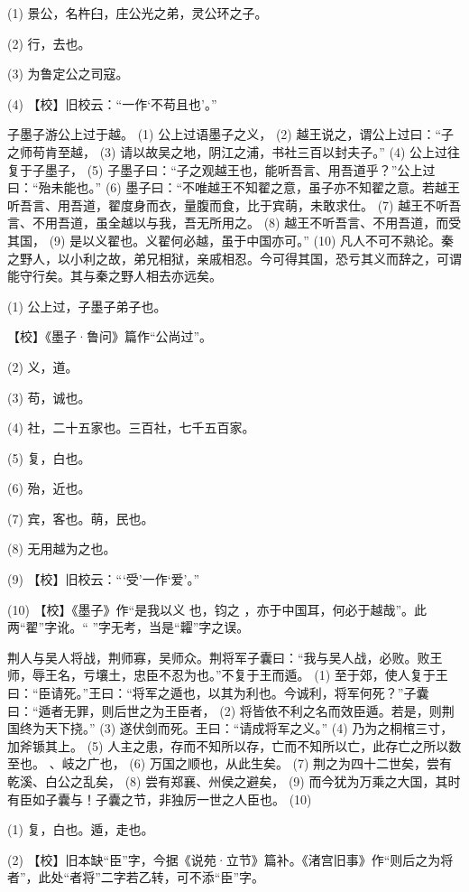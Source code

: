 \documentclass[12pt,UTF8]{ctexbook}
\begin{document}
(1) 景公，名杵臼，庄公光之弟，灵公环之子。

(2) 行，去也。

(3) 为鲁定公之司寇。

(4) 【校】旧校云：“一作‘不苟且也’。”

子墨子游公上过于越。 (1) 公上过语墨子之义， (2) 越王说之，谓公上过曰：“子之师苟肯至越， (3) 请以故吴之地，阴江之浦，书社三百以封夫子。” (4) 公上过往复于子墨子， (5) 子墨子曰：“子之观越王也，能听吾言、用吾道乎？”公上过曰：“殆未能也。” (6) 墨子曰：“不唯越王不知翟之意，虽子亦不知翟之意。若越王听吾言、用吾道，翟度身而衣，量腹而食，比于宾萌，未敢求仕。 (7) 越王不听吾言、不用吾道，虽全越以与我，吾无所用之。 (8) 越王不听吾言、不用吾道，而受其国， (9) 是以义翟也。义翟何必越，虽于中国亦可。” (10) 凡人不可不熟论。秦之野人，以小利之故，弟兄相狱，亲戚相忍。今可得其国，恐亏其义而辞之，可谓能守行矣。其与秦之野人相去亦远矣。

(1) 公上过，子墨子弟子也。

【校】《墨子·鲁问》篇作“公尚过”。

(2) 义，道。

(3) 苟，诚也。

(4) 社，二十五家也。三百社，七千五百家。

(5) 复，白也。

(6) 殆，近也。

(7) 宾，客也。萌，民也。

(8) 无用越为之也。

(9) 【校】旧校云：“‘受’一作‘爱’。”

(10) 【校】《墨子》作“是我以义 也，钧之 ，亦于中国耳，何必于越哉”。此两“翟”字讹。“ ”字无考，当是“糶”字之误。

荆人与吴人将战，荆师寡，吴师众。荆将军子囊曰：“我与吴人战，必败。败王师，辱王名，亏壤土，忠臣不忍为也。”不复于王而遁。 (1) 至于郊，使人复于王曰：“臣请死。”王曰：“将军之遁也，以其为利也。今诚利，将军何死？”子囊曰：“遁者无罪，则后世之为王臣者， (2) 将皆依不利之名而效臣遁。若是，则荆国终为天下挠。” (3) 遂伏剑而死。王曰：“请成将军之义。” (4) 乃为之桐棺三寸，加斧锧其上。 (5) 人主之患，存而不知所以存，亡而不知所以亡，此存亡之所以数至也。 、岐之广也， (6) 万国之顺也，从此生矣。 (7) 荆之为四十二世矣，尝有乾溪、白公之乱矣， (8) 尝有郑襄、州侯之避矣， (9) 而今犹为万乘之大国，其时有臣如子囊与！子囊之节，非独厉一世之人臣也。 (10)

(1) 复，白也。遁，走也。

(2) 【校】旧本缺“臣”字，今据《说苑·立节》篇补。《渚宫旧事》作“则后之为将者”，此处“者将”二字若乙转，可不添“臣”字。
\end{document}
